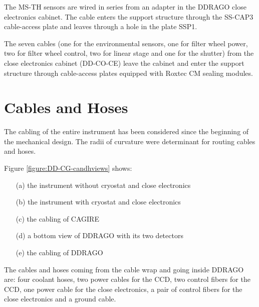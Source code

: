 \documentclass{report}
\begin{document}
The MS-TH sensors are wired in series from an adapter in the DDRAGO close electronics cabinet. The cable enters the support structure through the SS-CAP3 cable-access plate and leaves through a hole in the plate SSP1. 


The seven cables (one for the environmental sensors, one for filter wheel power,  two for filter wheel control, two for linear stage and one for the shutter) from the close electronics cabinet (DD-CO-CE) leave the cabinet and enter the support structure through cable-access plates equipped with Roxtec CM sealing modules.

\chapter{Cables and Hoses}

The cabling of the entire instrument has been considered since the beginning of the mechanical design. The radii of curvature were determinant for routing cables and hoses.

Figure \ref{figure:DD-CG-candhviews} shows:
\begin{enumerate}
\item[(a)] the instrument without cryostat and close electronics
\item[(b)] the instrument with cryostat and close electronics
\item[(c)] the cabling of CAGIRE
\item[(d)] a bottom view of DDRAGO with its two detectors
\item[(e)] the cabling of DDRAGO 
\end{enumerate}

The cables and hoses coming from the cable wrap and going inside DDRAGO are: four coolant hoses, two power cables for the CCD, two control fibers for the CCD, one power cable for the close electronics, a pair of control fibers for the close electronics and a ground cable.
\end{document}
